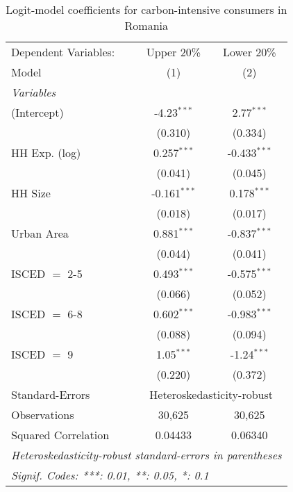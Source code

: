 
\begin{table}[htbp!]
   \centering
   \small
   \begin{adjustbox}{width = 1\textwidth, max height = 0.95\textheight, center}
      \begin{threeparttable}[b]
         \caption{\label{tab:Logit_1_ROU} Logit-model coefficients for carbon-intensive consumers in Romania}
         \begin{tabular}{lcc}
            \tabularnewline \midrule \midrule
            Dependent Variables: & Upper 20\%     & Lower 20\%\\   
            Model                & (1)            & (2)\\  
            \midrule
            \emph{Variables}\\
            (Intercept)          & -4.23$^{***}$  & 2.77$^{***}$\\   
                                 & (0.310)        & (0.334)\\   
            HH Exp. (log)        & 0.257$^{***}$  & -0.433$^{***}$\\   
                                 & (0.041)        & (0.045)\\   
            HH Size              & -0.161$^{***}$ & 0.178$^{***}$\\   
                                 & (0.018)        & (0.017)\\   
            Urban Area           & 0.881$^{***}$  & -0.837$^{***}$\\   
                                 & (0.044)        & (0.041)\\   
            ISCED $=$ 2-5        & 0.493$^{***}$  & -0.575$^{***}$\\   
                                 & (0.066)        & (0.052)\\   
            ISCED $=$ 6-8        & 0.602$^{***}$  & -0.983$^{***}$\\   
                                 & (0.088)        & (0.094)\\   
            ISCED $=$ 9          & 1.05$^{***}$   & -1.24$^{***}$\\   
                                 & (0.220)        & (0.372)\\   
            \midrule 
            Standard-Errors & \multicolumn{2}{c}{Heteroskedasticity-robust} \\ 
            Observations         & 30,625         & 30,625\\  
            Squared Correlation  & 0.04433        & 0.06340\\  
            \midrule \midrule
            \multicolumn{3}{l}{\emph{Heteroskedasticity-robust standard-errors in parentheses}}\\
            \multicolumn{3}{l}{\emph{Signif. Codes: ***: 0.01, **: 0.05, *: 0.1}}\\
         \end{tabular}
         

\end{threeparttable}
\end{adjustbox}
\end{table}
